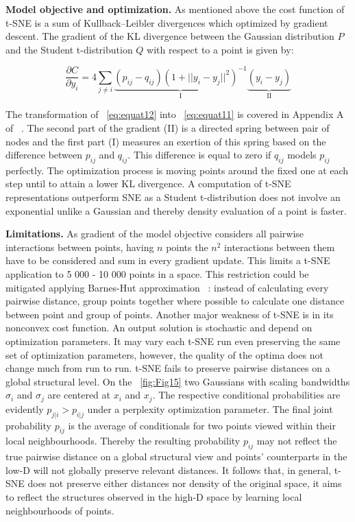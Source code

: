 \textbf{Model objective and optimization. }
As mentioned above the cost function of t-SNE is a sum of Kullback–Leibler divergences which optimized by gradient descent. The gradient of the KL divergence between the Gaussian distribution $P$ and the Student t-distribution $Q$ with respect to a point is given by:

\begin{equation}
  \frac{\partial C}{\partial y_i}= 4\sum_{j\neq i}\underbrace{(p_{ij}-q_{ij})(1+||y_i-y_j||^2)^{-1}}_\text{I}\underbrace{(y_i-y_j)}_\text{II}
    \label{eq:equat12}
\end{equation}

The transformation of ~\autoref{eq:equat12} into ~\autoref{eq:equat11} is covered in Appendix A of ~\cite{maaten2008visualizing}. The second part of the gradient (II) is a directed spring between pair of nodes and the first part (I) measures an exertion of this spring based on the difference between $p_{ij}$ and $q_{ij}$. This difference is equal to zero if $q_{ij}$ models $p_{ij}$ perfectly. The optimization process is moving points around the fixed one at each step until to attain a lower KL divergence.
A computation of t-SNE representations outperform SNE as a Student t-distribution does not involve an exponential unlike a Gaussian and thereby density evaluation of a point is faster.

\textbf{Limitations. }
As gradient of the model objective considers all pairwise interactions between points, having $n$ points the $n^2$ interactions between them have to be considered and sum in every gradient update. This limits a t-SNE application to 5 000 - 10 000 points in a space. This restriction could be mitigated applying Barnes-Hut approximation ~\cite{Barnes1986}: instead of calculating every pairwise distance, group points together where possible to calculate one distance between point and group of points.
Another major weakness of t-SNE is in its nonconvex cost function. An output solution is stochastic and depend on optimization parameters. It may vary each t-SNE run even preserving the same set of optimization parameters, however, the quality of the optima does not change much from run to run.
t-SNE fails to preserve pairwise distances on a global structural level. On the  ~\autoref{fig:Fig15} two Gaussians with scaling bandwidths $\sigma_i$ and $\sigma_j$ are centered at $x_i$ and $x_j$. The respective conditional probabilities are evidently $p_{j|i} > p_{i|j}$ under a perplexity optimization parameter. The final joint probability $p_{ij}$ is the average of conditionals for two points viewed within their local neighbourhoods. Thereby the resulting probability $p_{ij}$ may not reflect the true pairwise distance on a global structural view and points' counterparts in the low-D will not globally preserve relevant distances. It follows that, in general, t-SNE does not preserve either distances nor density of the original space, it aims to reflect the structures observed in the high-D space by learning local neighbourhoods of points. 

